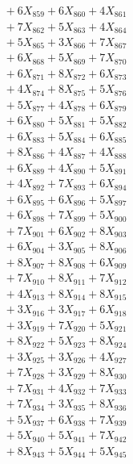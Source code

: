 \documentclass[a4paper,10pt]{article}
\begin{document}
{\begin{align}
&\;  + 6 X_{859} + 6 X_{860} + 4 X_{861} \\[0.3ex]
&\;  + 7 X_{862} + 5 X_{863} + 4 X_{864} \\[0.3ex]
&\;  + 5 X_{865} + 3 X_{866} + 7 X_{867} \\[0.3ex]
&\;  + 6 X_{868} + 5 X_{869} + 7 X_{870} \\[0.3ex]
&\;  + 6 X_{871} + 8 X_{872} + 6 X_{873} \\[0.3ex]
&\;  + 4 X_{874} + 8 X_{875} + 5 X_{876} \\[0.3ex]
&\;  + 5 X_{877} + 4 X_{878} + 6 X_{879} \\[0.5ex]\allowbreak
&\;  + 6 X_{880} + 5 X_{881} + 5 X_{882} \\[0.3ex]
&\;  + 6 X_{883} + 5 X_{884} + 6 X_{885} \\[0.3ex]
&\;  + 8 X_{886} + 4 X_{887} + 4 X_{888} \\[0.3ex]
&\;  + 6 X_{889} + 4 X_{890} + 5 X_{891} \\[0.3ex]
&\;  + 4 X_{892} + 7 X_{893} + 6 X_{894} \\[0.3ex]
&\;  + 6 X_{895} + 6 X_{896} + 5 X_{897} \\[0.3ex]
&\;  + 6 X_{898} + 7 X_{899} + 5 X_{900} \\[0.3ex]
&\;  + 7 X_{901} + 6 X_{902} + 8 X_{903} \\[0.3ex]
&\;  + 6 X_{904} + 3 X_{905} + 8 X_{906} \\[0.3ex]
&\;  + 8 X_{907} + 8 X_{908} + 6 X_{909} \\[0.5ex]\allowbreak
&\;  + 7 X_{910} + 8 X_{911} + 7 X_{912} \\[0.3ex]
&\;  + 4 X_{913} + 8 X_{914} + 8 X_{915} \\[0.3ex]
&\;  + 3 X_{916} + 3 X_{917} + 6 X_{918} \\[0.3ex]
&\;  + 3 X_{919} + 7 X_{920} + 5 X_{921} \\[0.3ex]
&\;  + 8 X_{922} + 5 X_{923} + 8 X_{924} \\[0.3ex]
&\;  + 3 X_{925} + 3 X_{926} + 4 X_{927} \\[0.3ex]
&\;  + 7 X_{928} + 3 X_{929} + 8 X_{930} \\[0.3ex]
&\;  + 7 X_{931} + 4 X_{932} + 7 X_{933} \\[0.3ex]
&\;  + 7 X_{934} + 3 X_{935} + 8 X_{936} \\[0.3ex]
&\;  + 5 X_{937} + 6 X_{938} + 7 X_{939} \\[0.5ex]\allowbreak
&\;  + 5 X_{940} + 5 X_{941} + 7 X_{942} \\[0.3ex]
&\;  + 8 X_{943} + 5 X_{944} + 5 X_{945} \\[0.3ex]

\end{align}}
\end{document}
